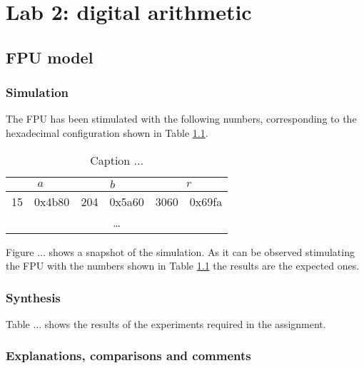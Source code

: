 \chapter{Lab 2: digital arithmetic}



\section{FPU model}

\subsection{Simulation}

The FPU has been stimulated with the following numbers, corresponding to the hexadecimal configuration shown in Table \ref{tab:cap2:tab1}.

\begin{table}
  \centering
  \caption{Caption ...}
  \label{tab:cap2:tab1}  
  \begin{tabular}{cc|cc|cc}
    \hline
    \multicolumn{2}{c}{$a$} & \multicolumn{2}{c}{$b$} & \multicolumn{2}{c}{$r$} \\
    \hline 
    15 & 0x4b80 & 204 & 0x5a60 & 3060 & 0x69fa \\
    \multicolumn{6}{c}{\dots} \\
    \hline    
  \end{tabular}
\end{table}

Figure ... shows a snapshot of the simulation. As it can be observed stimulating the FPU with the numbers shown in Table \ref{tab:cap2:tab1} the results are the expected ones.

\subsection{Synthesis}

Table ... shows the results of the experiments required in the assignment.

\subsection{Explanations, comparisons and comments}

